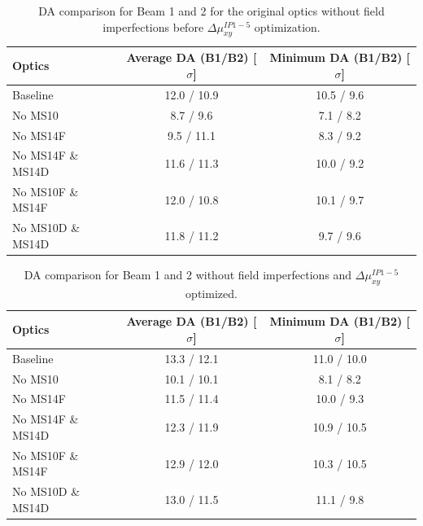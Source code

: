 \documentclass{cernatsnote}
\begin{document}
\begin{table}[h!]
\begin{center}
\caption{\label{da_tab_all} DA comparison for Beam 1 and 2 for the original optics without field imperfections before $\Delta\mu_{xy}^{IP1-5}$ optimization.}
\begin{tabular}{lcc} \hline
Optics &  Average DA (B1/B2) [$\sigma$] &   Minimum DA (B1/B2) [$\sigma$]     \\ \hline
Baseline  &     12.0 / 10.9      &      10.5 / 9.6     \\
No MS10  &    8.7 / 9.6       &     7.1 / 8.2      \\
No MS14F  &     9.5 / 11.1      &     8.3 / 9.2      \\
No MS14F \& MS14D  &     11.6 / 11.3      &     10.0 / 9.2      \\
No MS10F \& MS14F  &     12.0 / 10.8      &     10.1 / 9.7      \\
No MS10D \& MS14D  &     11.8 / 11.2      &     9.7 / 9.6      \\ \hline

\end{tabular}
\end{center}
\end{table}


\begin{table}[h!]
\begin{center}
\caption{\label{da_tab_all} DA comparison for Beam 1 and 2 without field imperfections and $\Delta\mu_{xy}^{IP1-5}$ optimized.}
\begin{tabular}{lcc} \hline
Optics &  Average DA (B1/B2) [$\sigma$] &   Minimum DA (B1/B2) [$\sigma$]     \\ \hline
Baseline  &     13.3 / 12.1      &      11.0 / 10.0     \\
No MS10  &    10.1 / 10.1       &     8.1 / 8.2      \\
No MS14F  &     11.5 / 11.4      &     10.0 / 9.3      \\
No MS14F \& MS14D  &     12.3 / 11.9      &     10.9 / 10.5      \\
No MS10F \& MS14F  &     12.9 / 12.0      &     10.3 / 10.5      \\
No MS10D \& MS14D  &     13.0 / 11.5      &     11.1 / 9.8      \\ \hline

\end{tabular}
\end{center}
\end{table}
\end{document}
